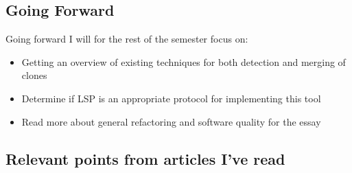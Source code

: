 \documentclass[12pt]{article}
\begin{document}
\subsection*{Going Forward}

Going forward I will for the rest of the semester focus on:

\begin{itemize}
    \item Getting an overview of existing techniques for both detection and merging of
        clones
    \item Determine if LSP is an appropriate protocol for implementing this tool
    \item Read more about general refactoring and software quality for the essay
\end{itemize}

\subsection*{Relevant points from articles I've read}
\end{document}
